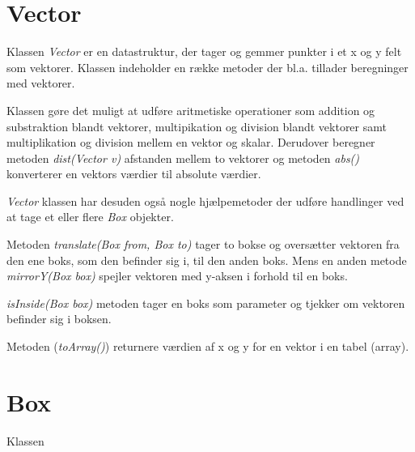 \section{Vector}

Klassen \emph{Vector} er en datastruktur, der tager og gemmer punkter i et x og y felt som vektorer.  Klassen indeholder en række metoder der bl.a. tillader beregninger med vektorer. 

Klassen gøre det muligt at udføre aritmetiske operationer som addition og substraktion blandt vektorer, multipikation og division blandt vektorer samt multiplikation og division mellem en vektor og skalar. Derudover beregner metoden \emph{dist(Vector v)} afstanden mellem to vektorer og metoden \emph{abs()} konverterer en vektors værdier til absolute værdier. 

\emph{Vector} klassen har desuden også nogle hjælpemetoder der udføre handlinger ved at tage et eller flere \emph{Box} objekter. 

Metoden \emph{translate(Box from, Box to)} tager to bokse og oversætter vektoren fra den ene boks, som den befinder sig i, til den anden boks. Mens en anden metode \emph{mirrorY(Box box)} spejler vektoren med y-aksen i forhold til en boks. 

\emph{isInside(Box box)} metoden tager en boks som parameter og tjekker om vektoren befinder sig i boksen.  

Metoden (\emph{toArray()}) returnere værdien af x og y for en vektor i en tabel (array).


\section{Box}

Klassen